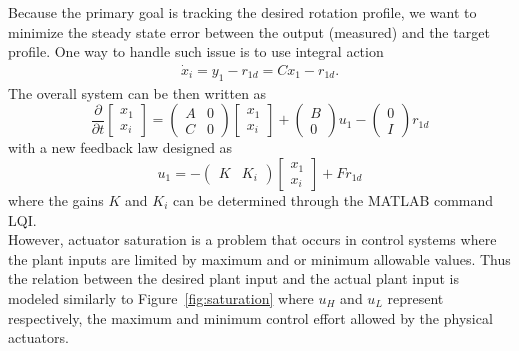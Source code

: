 \documentclass[12pt]{iopart}
\begin{document}
Because the primary goal is tracking the desired rotation profile, we want to minimize the steady state error between the output (measured) and the target profile. One way to handle such issue is to use integral action
\begin{eqnarray}
\dot{x}_i = y_1 - r_{1d} = C x_1 - r_{1d}.
 \label{integral}
\end{eqnarray}
The overall system can be then written as
\begin{equation}
\frac{\partial}{\partial t}   \left[\! \begin{array}{c}  x_1 \\ x_i\end{array}\!\right]
  ={ \left(\! \begin{array}{cc} A  & 0 \\ C & 0 \end{array} \! \right)} \left[\! \begin{array}{c} x_1 \\ x_i    \end{array}  \!\right] + \left(\! \begin{array}{c} B   \\ 0    \end{array}  \!\right) u_1 -  \left(\! \begin{array}{c}  0 \\ I \end{array}\!\right) r_{1d}
\label{int2}
\end{equation}
with a new feedback law designed as
\begin{equation}
u_1 =   - \left(\! \begin{array}{cc}  K & K_i\end{array}\!\right) \left[\! \begin{array}{c}  x_1 \\ x_i\end{array}\!\right] + F r_{1d}
\end{equation}
where the gains $K$ and $K_i$ can be determined through the MATLAB command LQI.\\

However, actuator saturation is a problem that occurs in control systems where the plant inputs are limited by maximum and or minimum allowable values. Thus the relation between the desired plant input and the actual plant input is modeled similarly to Figure~\ref{fig:saturation}
where $u_H$ and $u_L$ represent respectively, the maximum and minimum control effort allowed by the physical actuators.
\end{document}
